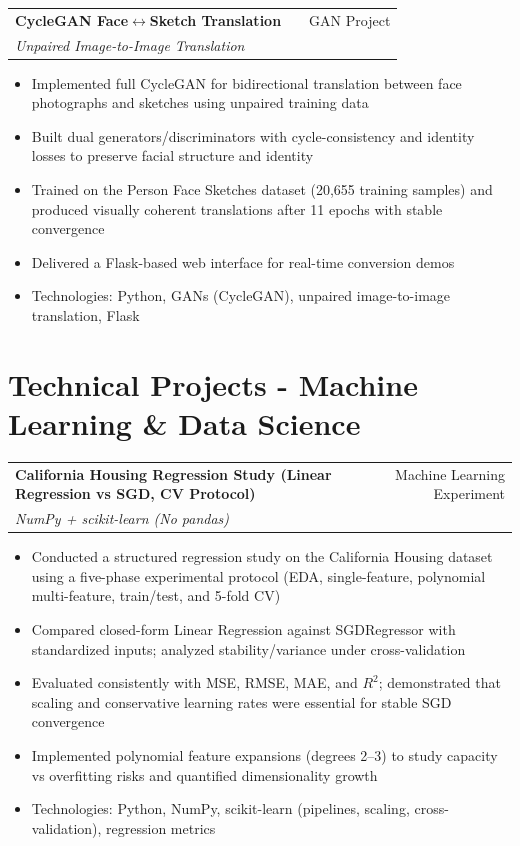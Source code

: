 \documentclass[a4paper,12pt]{article}
\makeatletter
\newenvironment{projectdetailed}[3]
    {
    \begin{tabularx}{\linewidth}{@{}l X r@{}}
    \textbf{#1} & \hfill & #2 \\
    \textit{#3} & & \\[3.75pt]
    \end{tabularx}
    \begin{minipage}[t]{\linewidth}
    \begin{itemize}[nosep,after=\strut, leftmargin=1em, itemsep=2pt,label=--]
    }
    {
    \end{itemize}
    \end{minipage}
    \vspace{6pt}
    }
\makeatother
\begin{document}
\begin{projectdetailed}{CycleGAN Face$\leftrightarrow$Sketch Translation}{GAN Project}{Unpaired Image-to-Image Translation}
\item Implemented full CycleGAN for bidirectional translation between face photographs and sketches using unpaired training data
\item Built dual generators/discriminators with cycle-consistency and identity losses to preserve facial structure and identity
\item Trained on the Person Face Sketches dataset (20,655 training samples) and produced visually coherent translations after 11 epochs with stable convergence
\item Delivered a Flask-based web interface for real-time conversion demos
\item Technologies: Python, GANs (CycleGAN), unpaired image-to-image translation, Flask
\end{projectdetailed}

\section{Technical Projects - Machine Learning \& Data Science}

\begin{projectdetailed}{California Housing Regression Study (Linear Regression vs SGD, CV Protocol)}{Machine Learning Experiment}{NumPy + scikit-learn (No pandas)}
\item Conducted a structured regression study on the California Housing dataset using a five-phase experimental protocol (EDA, single-feature, polynomial multi-feature, train/test, and 5-fold CV)
\item Compared closed-form Linear Regression against SGDRegressor with standardized inputs; analyzed stability/variance under cross-validation
\item Evaluated consistently with MSE, RMSE, MAE, and \(R^2\); demonstrated that scaling and conservative learning rates were essential for stable SGD convergence
\item Implemented polynomial feature expansions (degrees 2--3) to study capacity vs overfitting risks and quantified dimensionality growth
\item Technologies: Python, NumPy, scikit-learn (pipelines, scaling, cross-validation), regression metrics
\end{projectdetailed}
\end{document}
